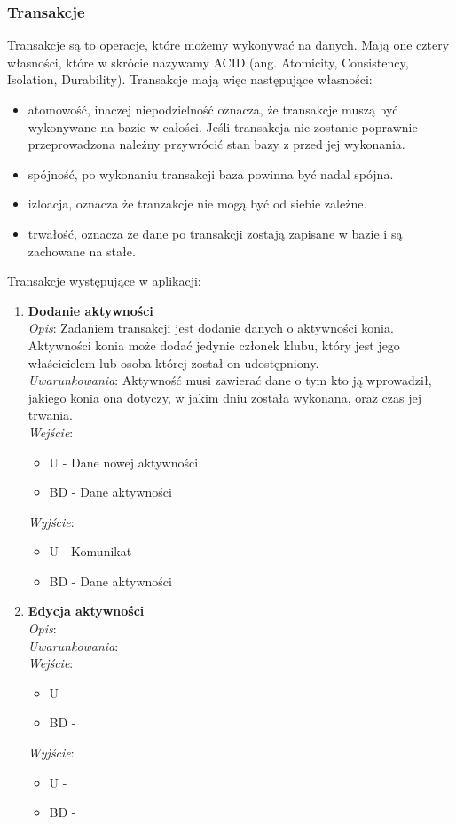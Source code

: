 \documentclass[12pt,twoside]{report}
\begin{document}
\subsubsection{Transakcje}
Transakcje są to operacje, które możemy wykonywać na danych. Mają one cztery własności, które w skrócie nazywamy ACID (ang. Atomicity, Consistency, Isolation, Durability). Transakcje mają więc następujące własności:
\begin{itemize}
	\item atomowość, inaczej niepodzielność oznacza, że transakcje muszą być wykonywane na bazie w całości. Jeśli transakcja nie zostanie poprawnie przeprowadzona należny przywrócić stan bazy z przed jej wykonania.
	\item spójność, po wykonaniu transakcji baza powinna być nadal spójna.
	\item izloacja, oznacza że tranzakcje nie mogą być od siebie zależne.
	\item trwałość, oznacza że dane po transakcji zostają zapisane w bazie i są zachowane na stałe.
\end{itemize}	
Transakcje występujące w aplikacji:
\begin{enumerate}[start=1,label={\bfseries TRA\textbackslash00\arabic*}]
	
	\item \textbf{Dodanie aktywności }\\
	\textit{Opis}: Zadaniem transakcji jest dodanie danych o aktywności konia. Aktywności konia może dodać jedynie członek klubu, który jest jego właścicielem lub osoba której został on udostępniony.\\
	\textit{Uwarunkowania}: Aktywność musi zawierać dane o tym kto ją wprowadził, jakiego konia ona dotyczy, w jakim dniu została wykonana, oraz czas jej trwania.\\
	\textit{Wejście}:
		\begin{itemize}
			\item U - Dane nowej aktywności
			\item BD - Dane aktywności
		\end{itemize} 
	\textit{Wyjście}:
		\begin{itemize}
			\item U - Komunikat
			\item BD - Dane aktywności
		\end{itemize} 
	
	\item \textbf{Edycja aktywności }\\
	\textit{Opis}: \\
	\textit{Uwarunkowania}: \\
	\textit{Wejście}:
	\begin{itemize}
		\item U - 
		\item BD -
	\end{itemize} 
	\textit{Wyjście}:
	\begin{itemize}
		\item U - 
		\item BD -
	\end{itemize} 
\end{enumerate}
\newpage
\end{document}
